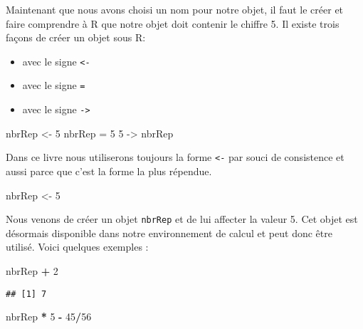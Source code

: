 \documentclass[]{book}
\newenvironment{Shaded}{\begin{snugshade}}{\end{snugshade}}
\newcommand{\DecValTok}[1]{\textcolor[rgb]{0.00,0.00,0.81}{#1}}
\newcommand{\StringTok}[1]{\textcolor[rgb]{0.31,0.60,0.02}{#1}}
\newcommand{\OperatorTok}[1]{\textcolor[rgb]{0.81,0.36,0.00}{\textbf{#1}}}
\newcommand{\NormalTok}[1]{#1}
\providecommand{\tightlist}{%
  \setlength{\itemsep}{0pt}\setlength{\parskip}{0pt}}
\theoremstyle{definition}
\theoremstyle{definition}
\theoremstyle{definition}
\theoremstyle{remark}
\begin{document}
Maintenant que nous avons choisi un nom pour notre objet, il faut le
créer et faire comprendre à R que notre objet doit contenir le chiffre
5. Il existe trois façons de créer un objet sous R:

\begin{itemize}
\tightlist
\item
  avec le signe \texttt{\textless{}-}
\item
  avec le signe \texttt{=}
\item
  avec le signe \texttt{-\textgreater{}}
\end{itemize}

\begin{Shaded}
\begin{Highlighting}[]
\NormalTok{nbrRep <-}\StringTok{ }\DecValTok{5}
\NormalTok{nbrRep =}\StringTok{ }\DecValTok{5}
\DecValTok{5}\NormalTok{ ->}\StringTok{ }\NormalTok{nbrRep}
\end{Highlighting}
\end{Shaded}

Dans ce livre nous utiliserons toujours la forme \texttt{\textless{}-}
par souci de consistence et aussi parce que c'est la forme la plus
répendue.

\begin{Shaded}
\begin{Highlighting}[]
\NormalTok{nbrRep <-}\StringTok{ }\DecValTok{5}
\end{Highlighting}
\end{Shaded}

Nous venons de créer un objet \texttt{nbrRep} et de lui affecter la
valeur 5. Cet objet est désormais disponible dans notre environnement de
calcul et peut donc être utilisé. Voici quelques exemples :

\begin{Shaded}
\begin{Highlighting}[]
\NormalTok{nbrRep }\OperatorTok{+}\StringTok{ }\DecValTok{2}
\end{Highlighting}
\end{Shaded}

\begin{verbatim}
## [1] 7
\end{verbatim}

\begin{Shaded}
\begin{Highlighting}[]
\NormalTok{nbrRep }\OperatorTok{*}\StringTok{ }\DecValTok{5} \OperatorTok{-}\StringTok{ }\DecValTok{45}\OperatorTok{/}\DecValTok{56}
\end{Highlighting}
\end{Shaded}
\end{document}
